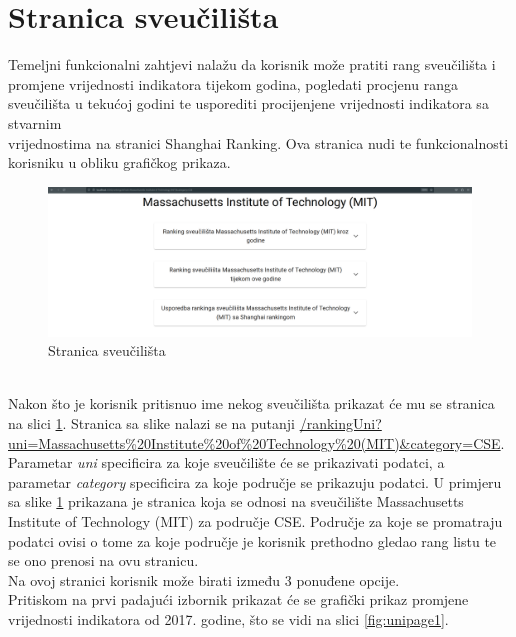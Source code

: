 \documentclass[times, utf8, zavrsni]{fer}
\begin{document}
\section{Stranica sveučilišta}
\label{section:unipagesection}
Temeljni funkcionalni zahtjevi nalažu da korisnik može pratiti rang sveučilišta i promjene vrijednosti indikatora tijekom godina, pogledati procjenu 
ranga sveučilišta u tekućoj godini te usporediti procijenjene vrijednosti indikatora sa stvarnim \\vrijednostima na stranici Shanghai Ranking. Ova stranica 
nudi te funkcionalnosti korisniku u obliku grafičkog prikaza. 
\\
\begin{figure}[htb]
    \hspace*{-2cm}  
       \includegraphics[scale=0.21]{unipage.png} 
       \caption{Stranica sveučilišta}
       \label{fig:unipage}
       \end{figure}
\\Nakon što je korisnik pritisnuo ime nekog sveučilišta prikazat će mu se stranica na slici \ref{fig:unipage}. Stranica sa slike nalazi se na putanji 
\url{/rankingUni?uni=Massachusetts\%20Institute\%20of\%20Technology\%20(MIT)\&category=CSE}. Parametar \emph{uni} specificira za koje sveučilište će se prikazivati podatci, a 
parametar \emph{category} specificira za koje područje se prikazuju podatci. U primjeru sa slike \ref{fig:unipage} prikazana je stranica koja se odnosi na sveučilište 
Massachusetts Institute of Technology (MIT) za područje CSE. Područje za koje se promatraju podatci ovisi o tome za koje područje je korisnik prethodno gledao 
rang listu te se ono prenosi na ovu stranicu. 
\\Na ovoj stranici korisnik može birati između 3 ponuđene opcije. 
\\Pritiskom na prvi padajući izbornik prikazat će se grafički prikaz promjene vrijednosti indikatora
od 2017. godine, što se vidi na slici \ref{fig:unipage1}. 
\end{document}
